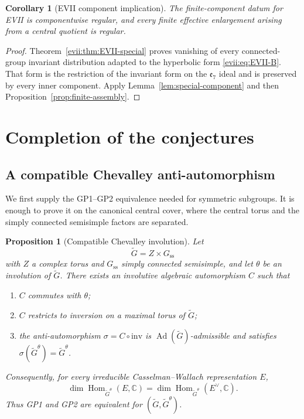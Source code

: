 \documentclass[10pt,a4paper]{amsart}
\numberwithin{equation}{section}
\newtheorem{proposition}[theorem]{Proposition}
\newtheorem{corollary}[theorem]{Corollary}
\newcommand{\C}{\mathbb C}
\newcommand{\Hom}{\operatorname{Hom}}
\newcommand{\Ad}{\operatorname{Ad}}
\begin{document}
\begin{corollary}[EVII component implication]\label{cor:EVII-component}
The finite-component datum for EVII is componentwise regular, and every finite
effective enlargement arising from a central quotient is regular.
\end{corollary}

\begin{proof}
Theorem~\ref{evii:thm:EVII-special} proves vanishing of every connected-group
invariant distribution adapted to the hyperbolic form
\eqref{evii:eq:EVII-B}.  That form is the restriction of the invariant form on
the $\mathfrak e_7$ ideal and is preserved by every inner component.  Apply
Lemma~\ref{lem:special-component} and then
Proposition~\ref{prop:finite-assembly}.
\end{proof}

\section{Completion of the conjectures}\label{sec:completion}

\subsection{A compatible Chevalley anti-automorphism}

We first supply the GP1--GP2 equivalence needed for symmetric subgroups.  It is
enough to prove it on the canonical central cover, where the central torus and
the simply connected semisimple factors are separated.

\begin{proposition}[Compatible Chevalley involution]
\label{prop:compatible-chevalley}
Let
\[
 \widetilde G=Z\times G_{\mathrm{ss}}
\]
with $Z$ a complex torus and $G_{\mathrm{ss}}$ simply connected semisimple, and
let $\theta$ be an involution of $\widetilde G$.  There exists an involutive
algebraic automorphism $C$ such that
\begin{enumerate}[label=\textup{(\roman*)}]
\item $C$ commutes with $\theta$;
\item $C$ restricts to inversion on a maximal torus of $\widetilde G$;
\item the anti-automorphism $\sigma=C\circ\mathrm{inv}$ is
      $\Ad(\widetilde G)$-admissible and satisfies
      $\sigma(\widetilde G^\theta)=\widetilde G^\theta$.
\end{enumerate}
Consequently, for every irreducible Casselman--Wallach representation $E$,
\[
 \dim\Hom_{\widetilde G^\theta}(E,\C)
 =\dim\Hom_{\widetilde G^\theta}(E^\vee,\C).
\]
Thus GP1 and GP2 are equivalent for $(\widetilde G,\widetilde G^\theta)$.
\end{proposition}
\end{document}
